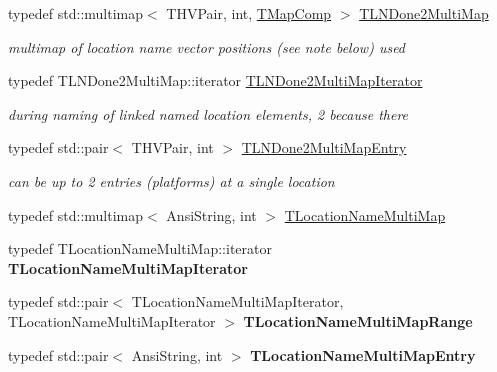 \begin{DoxyCompactItemize}
typedef std\+::multimap$<$ T\+H\+V\+Pair, int, \mbox{\hyperlink{class_t_map_comp}{T\+Map\+Comp}} $>$ \mbox{\hyperlink{class_t_track_a3005ddcbe9fd2a56040a8a66e6dc0b61}{T\+L\+N\+Done2\+Multi\+Map}}
\begin{DoxyCompactList}\small\item\em multimap of location name vector positions (see note below) used \end{DoxyCompactList}\item 
\mbox{\label{class_t_track_af5a53d40ae46b83d6fa26f03af55d941}} 
typedef T\+L\+N\+Done2\+Multi\+Map\+::iterator \mbox{\hyperlink{class_t_track_af5a53d40ae46b83d6fa26f03af55d941}{T\+L\+N\+Done2\+Multi\+Map\+Iterator}}
\begin{DoxyCompactList}\small\item\em during naming of linked named location elements, \textquotesingle{}2\textquotesingle{} because there \end{DoxyCompactList}\item 
\mbox{\label{class_t_track_adc8a7f87a6c265601df84db3d38b6219}} 
typedef std\+::pair$<$ T\+H\+V\+Pair, int $>$ \mbox{\hyperlink{class_t_track_adc8a7f87a6c265601df84db3d38b6219}{T\+L\+N\+Done2\+Multi\+Map\+Entry}}
\begin{DoxyCompactList}\small\item\em can be up to 2 entries (platforms) at a single location \end{DoxyCompactList}\item 
typedef std\+::multimap$<$ Ansi\+String, int $>$ \mbox{\hyperlink{class_t_track_ac68eed5a26013072d6852aa2e6d6f33d}{T\+Location\+Name\+Multi\+Map}}
\item 
\mbox{\label{class_t_track_af5ae176b1d8ec7a205557655e8b5c192}} 
typedef T\+Location\+Name\+Multi\+Map\+::iterator {\bfseries T\+Location\+Name\+Multi\+Map\+Iterator}
\item 
\mbox{\label{class_t_track_acde3e8d68f9bab58afc4543f6bae2696}} 
typedef std\+::pair$<$ T\+Location\+Name\+Multi\+Map\+Iterator, T\+Location\+Name\+Multi\+Map\+Iterator $>$ {\bfseries T\+Location\+Name\+Multi\+Map\+Range}
\item 
\mbox{\label{class_t_track_ab607b7a616cd970a8f2ac0258db302b2}} 
typedef std\+::pair$<$ Ansi\+String, int $>$ {\bfseries T\+Location\+Name\+Multi\+Map\+Entry}

\end{DoxyCompactItemize}
